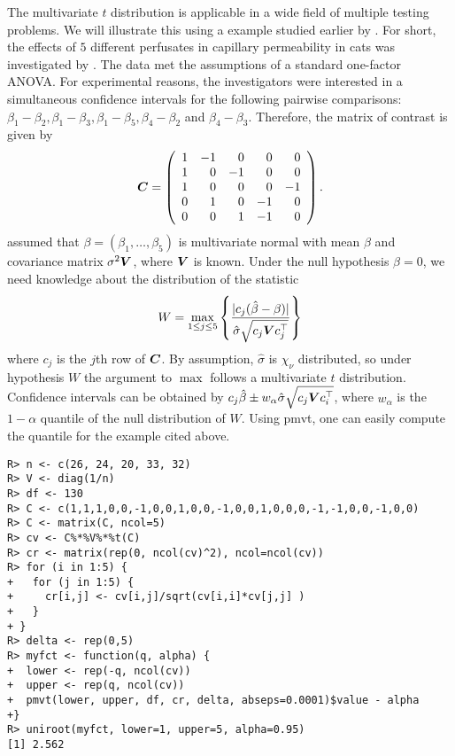 \documentclass[11pt]{amsart}
\newcommand{\C}{\mbox{\boldmath $C$}}
\newcommand{\V}{\mbox{\boldmath $V$}}
\begin{document}
The multivariate $t$ distribution is applicable in a wide field
of multiple testing problems. We will illustrate this using a
example studied earlier by \cite{the-effici:1987}. For short, the
effects of $5$ different perfusates in capillary permeability in
cats was investigated by \cite{blood-and-:1987}. The data met the
assumptions of a standard one-factor ANOVA. For experimental
reasons, the investigators were interested in a simultaneous
confidence intervals for the following pairwise comparisons: $
\beta_1 - \beta_2, \beta_1 - \beta_3, \beta_1 - \beta_5, \beta_4
- \beta_2 $ and $ \beta_4 - \beta_3 $. Therefore, the matrix of
contrast is given by
\begin{eqnarray*}
\C = \left( \begin{array}{rrrrr} 1 & -1 & 0 & 0 & 0 \\
1 & 0 & -1 & 0 & 0 \\
1 & 0 & 0 & 0 & -1 \\
0 & 1 & 0 & -1 & 0 \\
0 & 0 & 1 & -1 & 0 \end{array} \right) .
\end{eqnarray*}
\cite{the-effici:1987} assumed that $ \beta = (\beta_1, \dots, \beta_5) $ is
multivariate normal with mean $ \beta $ and covariance matrix $ \sigma^2 \V
$, where $ \V $ is known. Under the null hypothesis $ \beta = 0 $, we need
knowledge about the
distribution of the statistic
\begin{eqnarray*}
W = \max_{1 \le j \le 5} \left\{ \frac{| c_j(\hat{\beta} - \beta)
|}{\hat{\sigma}\sqrt{c_j \V c_j^{\top}}} \right\}
\end{eqnarray*}
where $ c_j $ is the $j$th row of $ \C $. By assumption,
$\hat{\sigma}$ is $ \chi_\nu $ distributed, so under hypothesis $
W $ the argument to $ \max $ follows a multivariate $ t $
distribution. Confidence intervals can be obtained by $ c_j
\hat{\beta} \pm w_\alpha \hat{\sigma} \sqrt{c_j \V c_i^\top} $,
where $ w_\alpha $ is the $ 1 - \alpha $ quantile of the null
distribution of $ W $. Using {\ttfamily pmvt}, one can easily
compute the quantile for the example cited above.

\begin{verbatim}
R> n <- c(26, 24, 20, 33, 32)
R> V <- diag(1/n)
R> df <- 130
R> C <- c(1,1,1,0,0,-1,0,0,1,0,0,-1,0,0,1,0,0,0,-1,-1,0,0,-1,0,0)
R> C <- matrix(C, ncol=5)
R> cv <- C%*%V%*%t(C)
R> cr <- matrix(rep(0, ncol(cv)^2), ncol=ncol(cv))
R> for (i in 1:5) {
+   for (j in 1:5) {
+     cr[i,j] <- cv[i,j]/sqrt(cv[i,i]*cv[j,j] )
+   }
+ }
R> delta <- rep(0,5)
R> myfct <- function(q, alpha) {
+  lower <- rep(-q, ncol(cv))
+  upper <- rep(q, ncol(cv))
+  pmvt(lower, upper, df, cr, delta, abseps=0.0001)$value - alpha
+}
R> uniroot(myfct, lower=1, upper=5, alpha=0.95)
[1] 2.562
\end{verbatim}
\end{document}
